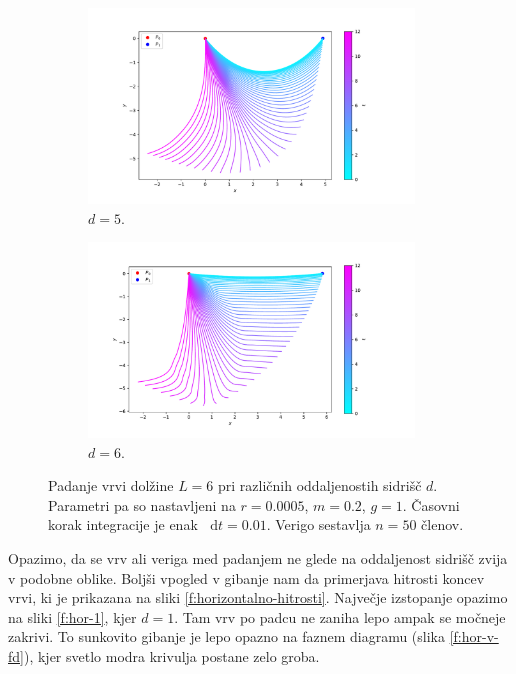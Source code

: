 \documentclass[a4paper, 12pt, slovene]{article}
\newcommand*\diff{\mathop{}\!\mathrm{d}}
\numberwithin{equation}{section}
\begin{document}
\begin{figure}[H]\ContinuedFloat
\begin{subfigure}{0.495\textwidth}
	\centering
	\includegraphics[width=0.95\textwidth]{grafi/falling_chain_P.5.0--0.05_L.6_n.48_t.12_r.0.0005_m.0.2_g.1_dt.0.01_freq.25.pdf}
	\caption{$d = 5$.}
	\label{f:hor-5}
\end{subfigure}
\begin{subfigure}{0.495\textwidth}
	\centering
	\includegraphics[width=0.95\textwidth]{grafi/falling_chain_P.5.99-0.0_L.6_n.50_t.12_r.0.0005_m.0.2_g.1_dt.0.01_freq.25.pdf}
	\caption{$d = 6$.}
	\label{f:hor-6}
\end{subfigure}
\caption{Padanje vrvi dolžine $L=6$ pri različnih oddaljenostih sidrišč $d$. Parametri pa so nastavljeni na $r=0.0005$, $m=0.2$, $g=1$. Časovni korak integracije je enak $\diff t = 0.01$. Verigo sestavlja $n=50$ členov.}
\label{f:horizontalno}
\end{figure}


Opazimo, da se vrv ali veriga med padanjem ne glede na oddaljenost sidrišč zvija v podobne oblike. Boljši vpogled v gibanje nam da primerjava hitrosti koncev vrvi, ki je prikazana na sliki \ref{f:horizontalno-hitrosti}. Največje izstopanje opazimo na sliki \ref{f:hor-1}, kjer $d=1$. Tam vrv po padcu ne zaniha lepo ampak se močneje zakrivi. To sunkovito gibanje je lepo opazno na faznem diagramu (slika \ref{f:hor-v-fd}), kjer svetlo modra krivulja postane zelo groba. \par\vspace{5mm}
\end{document}
